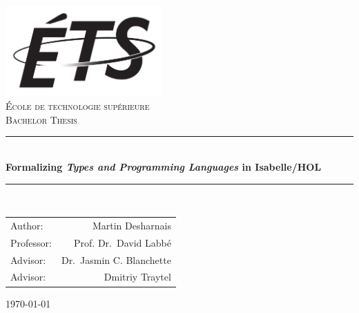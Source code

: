 \documentclass[12pt,a4paper,titlepage,oneside]{article}
\newcommand{\HRule}{\rule{\linewidth}{0.5mm}}
\begin{document}

\begin{titlepage}
  \begin{center}
    \includegraphics[width=6cm]{./logo-ETS.png}~\\[1cm]

    \textsc{\LARGE École de technologie supérieure}\\[1.5cm]
    \textsc{\Large Bachelor Thesis}\\[0.5cm]

    \HRule \\[0.4cm]
    { \huge \bfseries Formalizing \emph{Types and Programming Languages} in Isabelle/HOL \\[0.4cm] }

    \HRule \\[1.5cm]

    \begin{center}
      \begin{tabular}{lr}
        Author:    & Martin Desharnais \\
        Professor: & Prof. Dr.~David Labbé \\
        Advisor:   & Dr.~Jasmin C. Blanchette \\
        Advisor:   & Dmitriy Traytel
      \end{tabular}
    \end{center}

    \vfill

    {\large \today}

  \end{center}
\end{titlepage}

\end{document}
